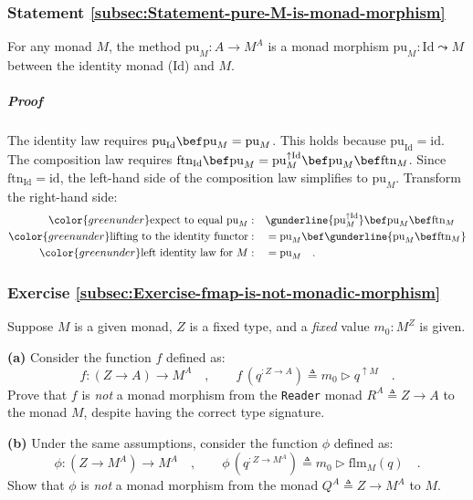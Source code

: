 \subsubsection{Statement \label{subsec:Statement-pure-M-is-monad-morphism}\ref{subsec:Statement-pure-M-is-monad-morphism}}

For any monad $M$, the method $\text{pu}_{M}:A\rightarrow M^{A}$
is a monad morphism $\text{pu}_{M}:\text{Id}\leadsto M$ between the
identity monad ($\text{Id}$) and $M$.

\subparagraph{Proof}

The identity law requires $\text{pu}_{\text{Id}}\bef\text{pu}_{M}=\text{pu}_{M}$.
This holds because $\text{pu}_{\text{Id}}=\text{id}$. The composition
law requires $\text{ftn}_{\text{Id}}\bef\text{pu}_{M}=\text{pu}_{M}^{\uparrow\text{Id}}\bef\text{pu}_{M}\bef\text{ftn}_{M}$.
Since $\text{ftn}_{\text{Id}}=\text{id}$, the left-hand side of the
composition law simplifies to $\text{pu}_{M}$. Transform the right-hand
side:
\begin{align*}
{\color{greenunder}\text{expect to equal }\text{pu}_{M}:}\quad & \gunderline{\text{pu}_{M}^{\uparrow\text{Id}}}\bef\text{pu}_{M}\bef\text{ftn}_{M}\\
{\color{greenunder}\text{lifting to the identity functor}:}\quad & =\text{pu}_{M}\bef\gunderline{\text{pu}_{M}\bef\text{ftn}_{M}}\\
{\color{greenunder}\text{left identity law for }M:}\quad & =\text{pu}_{M}\quad.
\end{align*}


\subsubsection{Exercise \label{subsec:Exercise-fmap-is-not-monadic-morphism}\ref{subsec:Exercise-fmap-is-not-monadic-morphism}}

Suppose $M$ is a given monad, $Z$ is a fixed type, and a \emph{fixed}
value $m_{0}:M^{Z}$ is given.

\textbf{(a)} Consider the function $f$ defined as:
\[
f:\left(Z\rightarrow A\right)\rightarrow M^{A}\quad,\quad\quad f\,(q^{:Z\rightarrow A})\triangleq m_{0}\triangleright q^{\uparrow M}\quad.
\]
Prove that $f$ is \emph{not} a monad morphism from the \lstinline!Reader!
monad $R^{A}\triangleq Z\rightarrow A$ to the monad $M$, despite
having the correct type signature.

\textbf{(b)} Under the same assumptions, consider the function $\phi$
defined as:
\[
\phi:(Z\rightarrow M^{A})\rightarrow M^{A}\quad,\quad\quad\phi\,(q^{:Z\rightarrow M^{A}})\triangleq m_{0}\triangleright\text{flm}_{M}(q)\quad.
\]
Show that $\phi$ is \emph{not} a monad morphism from the monad $Q^{A}\triangleq Z\rightarrow M^{A}$
to $M$.


